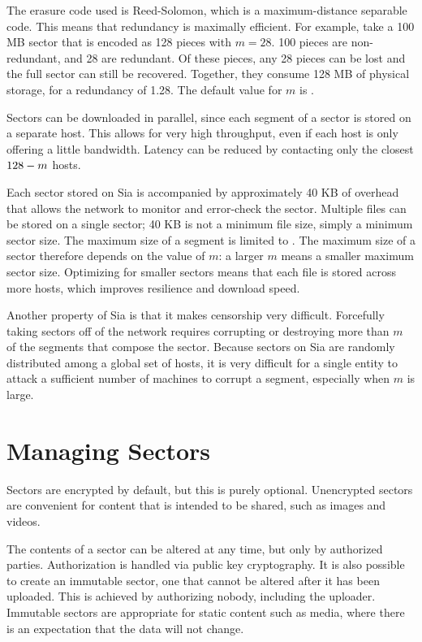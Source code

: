 \documentclass[twocolumn]{article}
\begin{document}
The erasure code used is Reed-Solomon, which is a maximum-distance separable code.
This means that redundancy is maximally efficient.
For example, take a 100 MB sector that is encoded as 128 pieces with \(m = 28\).
100 pieces are non-redundant, and 28 are redundant.
Of these pieces, any 28 pieces can be lost and the full sector can still be recovered.
Together, they consume 128 MB of physical storage, for a redundancy of 1.28.
The default value for \(m\) is .

Sectors can be downloaded in parallel, since each segment of a sector is stored on a separate host.
This allows for very high throughput, even if each host is only offering a little bandwidth.
Latency can be reduced by contacting only the closest \(128{} - m\) hosts.

Each sector stored on Sia is accompanied by approximately 40 KB of overhead that allows the network to monitor and error-check the sector.
Multiple files can be stored on a single sector; 40 KB is not a minimum file size, simply a minimum sector size.
The maximum size of a segment is limited to \maxsegmentsize.
The maximum size of a sector therefore depends on the value of \(m\): a larger \(m\) means a smaller maximum sector size.
Optimizing for smaller sectors means that each file is stored across more hosts, which improves resilience and download speed.

Another property of Sia is that it makes censorship very difficult.
Forcefully taking sectors off of the network requires corrupting or destroying more than \(m\) of the \quorumsize{} segments that compose the sector.
Because sectors on Sia are randomly distributed among a global set of hosts, it is very difficult for a single entity to attack a sufficient number of machines to corrupt a segment, especially when \(m\) is large.

\section{Managing Sectors}
Sectors are encrypted by default, but this is purely optional.
Unencrypted sectors are convenient for content that is intended to be shared, such as images and videos.

The contents of a sector can be altered at any time, but only by authorized parties.
Authorization is handled via public key cryptography.
It is also possible to create an immutable sector, one that cannot be altered after it has been uploaded.
This is achieved by authorizing nobody, including the uploader.
Immutable sectors are appropriate for static content such as media, where there is an expectation that the data will not change.
\end{document}
